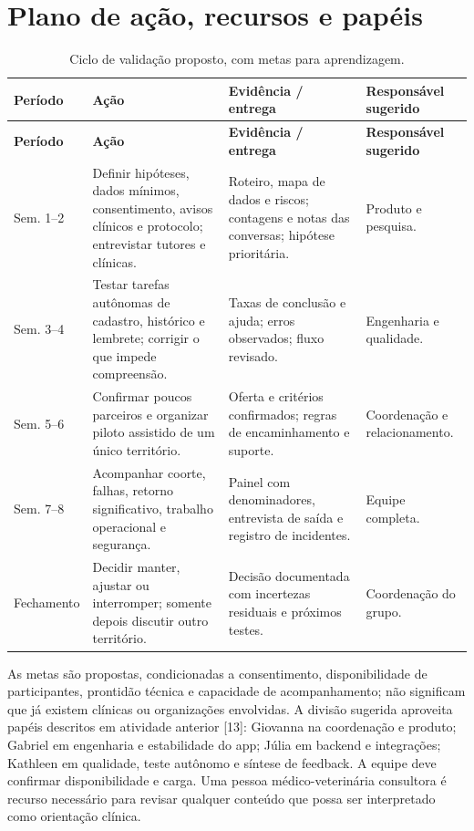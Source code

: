\documentclass[12pt,a4paper]{article}
\begin{document}
\section{Plano de ação, recursos e papéis}
\begin{longtable}{p{1.8cm}p{4.4cm}p{4.2cm}p{2.8cm}}
\caption{Ciclo de validação proposto, com metas para aprendizagem.}\\
\toprule
\textbf{Período} & \textbf{Ação} & \textbf{Evidência / entrega} & \textbf{Responsável sugerido}\\
\midrule
\endfirsthead
\toprule\textbf{Período} & \textbf{Ação} & \textbf{Evidência / entrega} & \textbf{Responsável sugerido}\\\midrule
\endhead
Sem. 1--2 & Definir hipóteses, dados mínimos, consentimento, avisos clínicos e protocolo; entrevistar tutores e clínicas. & Roteiro, mapa de dados e riscos; contagens e notas das conversas; hipótese prioritária. & Produto e pesquisa.\\
Sem. 3--4 & Testar tarefas autônomas de cadastro, histórico e lembrete; corrigir o que impede compreensão. & Taxas de conclusão e ajuda; erros observados; fluxo revisado. & Engenharia e qualidade.\\
Sem. 5--6 & Confirmar poucos parceiros e organizar piloto assistido de um único território. & Oferta e critérios confirmados; regras de encaminhamento e suporte. & Coordenação e relacionamento.\\
Sem. 7--8 & Acompanhar coorte, falhas, retorno significativo, trabalho operacional e segurança. & Painel com denominadores, entrevista de saída e registro de incidentes. & Equipe completa.\\
Fechamento & Decidir manter, ajustar ou interromper; somente depois discutir outro território. & Decisão documentada com incertezas residuais e próximos testes. & Coordenação do grupo.\\
\bottomrule
\end{longtable}

As metas são propostas, condicionadas a consentimento, disponibilidade de participantes, prontidão técnica e capacidade de acompanhamento; não significam que já existem clínicas ou organizações envolvidas. A divisão sugerida aproveita papéis descritos em atividade anterior [13]: Giovanna na coordenação e produto; Gabriel em engenharia e estabilidade do app; Júlia em backend e integrações; Kathleen em qualidade, teste autônomo e síntese de feedback. A equipe deve confirmar disponibilidade e carga. Uma pessoa médico-veterinária consultora é recurso necessário para revisar qualquer conteúdo que possa ser interpretado como orientação clínica.
\end{document}
